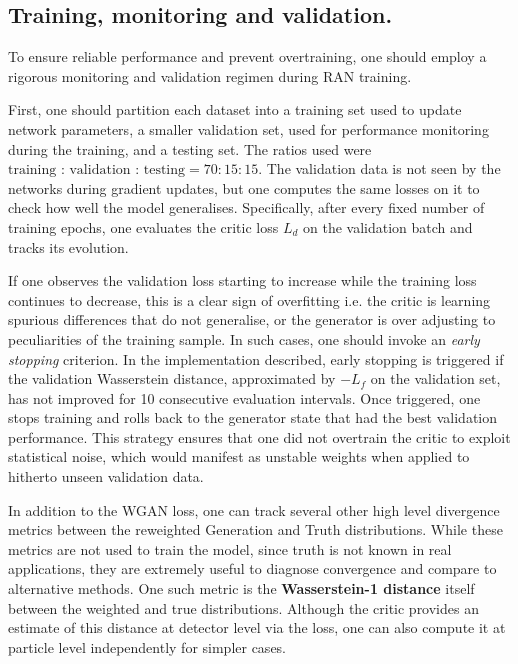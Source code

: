 {{    \subsection{Training, monitoring and validation.}
    
        To ensure reliable performance and prevent overtraining, one should employ a rigorous monitoring and validation regimen during RAN training.
        
        First, one should partition each dataset into a training set used to update network parameters, a smaller validation set, used for performance monitoring during the training, and a testing set.
        The ratios used were \(\text{training : validation : testing} = 70:15:15.\)
        The validation data is not seen by the networks during gradient updates, but one computes the same losses on it to check how well the model generalises.
        Specifically, after every fixed number of training epochs, one evaluates the critic loss $L_d$ on the validation batch and tracks its evolution.
        
        If one observes the validation loss starting to increase while the training loss continues to decrease, this is a clear sign of overfitting i.e. the critic is learning spurious differences that do not generalise, or the generator is over adjusting to peculiarities of the training sample.
        In such cases, one should invoke an \emph{early stopping} criterion.
        In the implementation described, early stopping is triggered if the validation Wasserstein distance, approximated by $-L_f$ on the validation set, has not improved for 10 consecutive evaluation intervals.
        Once triggered, one stops training and rolls back to the generator state that had the best validation performance.
        This strategy ensures that one did not overtrain the critic to exploit statistical noise, which would manifest as unstable weights when applied to hitherto unseen validation data.

        In addition to the WGAN loss, one can track several other high level divergence metrics between the reweighted Generation and Truth distributions.
        While these metrics are not used to train the model, since truth is not known in real applications, they are extremely useful to diagnose convergence and compare to alternative methods.
        One such metric is the \textbf{Wasserstein-1 distance} itself between the weighted and true distributions.
        Although the critic provides an estimate of this distance at detector level via the loss, one can also compute it at particle level independently for simpler cases.
        
}}
